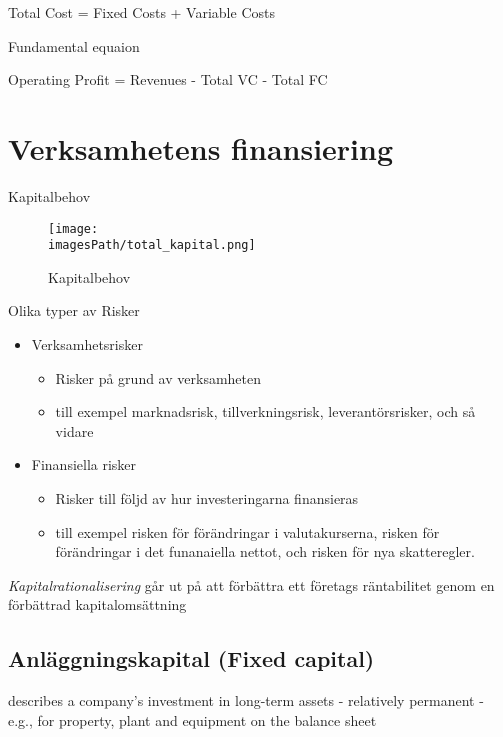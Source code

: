 \documentclass{article}
\newcommand{\imagesPath}{images}
\begin{document}
\begin{center}
    Total Cost = Fixed Costs + Variable Costs
\end{center}

Fundamental equaion 
\begin{center}
    Operating Profit = Revenues - Total VC - Total FC
\end{center}

\section{Verksamhetens finansiering}
Kapitalbehov 
\begin{figure}[!h]
    \centering
    \texttt{[image: \\imagesPath/total\_kapital.png]}
    \caption{Kapitalbehov}
\end{figure}

Olika typer av Risker 
\begin{itemize}
    \item Verksamhetsrisker
    \begin{itemize}
        \item Risker på grund av verksamheten
        \item till exempel marknadsrisk, tillverkningsrisk, leverantörsrisker, och så vidare
    \end{itemize}
    \item Finansiella risker 
    \begin{itemize}
        \item Risker till följd av hur investeringarna finansieras
        \item till exempel risken för förändringar i valutakurserna, risken för förändringar i det funanaiella nettot, och risken för nya skatteregler.
    \end{itemize}
\end{itemize}

\textit{Kapitalrationalisering} går ut på att förbättra ett företags räntabilitet genom en förbättrad kapitalomsättning
\subsection{Anläggningskapital (Fixed capital)}
describes a company's investment in long-term assets - relatively permanent 
- e.g., for property, plant and equipment on the balance sheet
\end{document}
